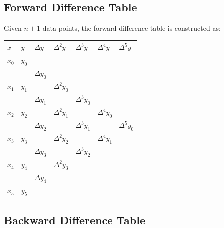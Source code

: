 \documentclass[12pt]{article}
\newcommand{\hcell}[1]{\textbf{\color{white}#1}}
\begin{document}
\bigskip

\subsection*{Forward Difference Table}

Given $n+1$ data points, the forward difference table is constructed as:

\begin{center}{\small
\begin{tabular}{C{1.5cm} C{1.5cm} C{2cm} C{2cm} C{2cm} C{2cm} C{2cm}}
\toprule
{}
\hcell{$x$} & \hcell{$y$} & \hcell{$\Delta y$} & \hcell{$\Delta^2 y$} & \hcell{$\Delta^3 y$} & \hcell{$\Delta^4 y$} & \hcell{$\Delta^5 y$} \\
\midrule
{}
$x_0$ & $y_0$ & & & & & \\
      &       & $\Delta y_0$ & & & & \\
$x_1$ & $y_1$ & & $\Delta^2 y_0$ & & & \\
      &       & $\Delta y_1$ & & $\Delta^3 y_0$ & & \\
$x_2$ & $y_2$ & & $\Delta^2 y_1$ & & $\Delta^4 y_0$ & \\
      &       & $\Delta y_2$ & & $\Delta^3 y_1$ & & $\Delta^5 y_0$ \\
$x_3$ & $y_3$ & & $\Delta^2 y_2$ & & $\Delta^4 y_1$ & \\
      &       & $\Delta y_3$ & & $\Delta^3 y_2$ & & \\
$x_4$ & $y_4$ & & $\Delta^2 y_3$ & & & \\
      &       & $\Delta y_4$ & & & & \\
$x_5$ & $y_5$ & & & & & \\
\bottomrule
\end{tabular}
}\end{center}

\bigskip

\subsection*{Backward Difference Table}
\end{document}
